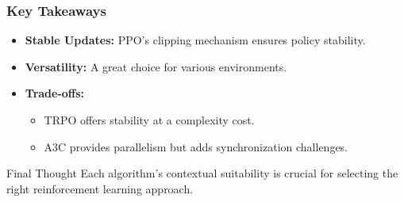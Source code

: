 \documentclass{beamer}
\begin{document}
\begin{frame}[fragile]
    \frametitle{Key Takeaways}
    \begin{itemize}
        \item \textbf{Stable Updates:} PPO's clipping mechanism ensures policy stability.
        \item \textbf{Versatility:} A great choice for various environments.
        \item \textbf{Trade-offs:} 
        \begin{itemize}
            \item TRPO offers stability at a complexity cost. 
            \item A3C provides parallelism but adds synchronization challenges.
        \end{itemize}
    \end{itemize}
    \begin{block}{Final Thought}
        Each algorithm's contextual suitability is crucial for selecting the right reinforcement learning approach.
    \end{block}
\end{frame}
\end{document}
